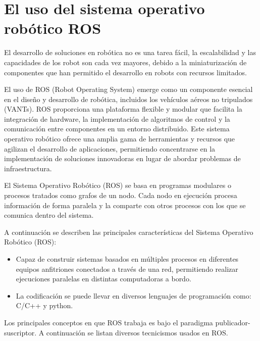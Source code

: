 \section{El uso del sistema operativo robótico ROS}

El desarrollo de soluciones en robótica no es una tarea fácil, la escalabilidad y las capacidades de los robot son cada vez mayores, debido a la miniaturización de componentes que han permitido el desarrollo en robots con recursos limitados.

El uso de ROS (Robot Operating System) emerge como un componente esencial en el diseño y desarrollo de robótica, incluidos los vehículos aéreos no tripulados (VANTs). ROS proporciona una plataforma flexible y modular que facilita la integración de hardware, la implementación de algoritmos de control y la comunicación entre componentes en un entorno distribuido. Este sistema operativo robótico ofrece una amplia gama de herramientas y recursos que agilizan el desarrollo de aplicaciones, permitiendo concentrarse en la implementación de soluciones innovadoras en lugar de abordar problemas de infraestructura.


El Sistema Operativo Robótico (ROS) se basa en programas modulares o procesos tratados como grafos de un nodo. Cada nodo en ejecución procesa información de forma paralela y la comparte con otros procesos con los que se comunica dentro del sistema.

A continuación se describen las principales características del Sistema Operativo Robótico (ROS):

\begin{itemize}\setlength{\itemsep}{-1mm}
\item Capaz de construir sistemas basados en múltiples procesos en diferentes equipos anfitriones conectados a través de una red, permitiendo realizar ejecuciones paralelas en distintas computadoras a bordo.
\item La codificación se puede llevar en diversos lenguajes de programación como: C/C++ y python.
\end{itemize}

Los principales conceptos en que ROS trabaja es bajo el paradigma publicador-suscriptor. A continuación se listan diversos tecnicismos usados en ROS.

